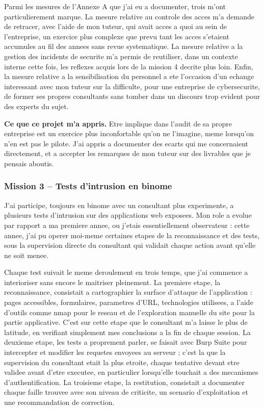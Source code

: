 \documentclass[11pt,a4paper]{article}
\begin{document}
Parmi les mesures de l'Annexe A que j'ai eu a documenter, trois m'ont particulierement marque. La mesure relative au controle des acces m'a demande de retracer, avec l'aide de mon tuteur, qui avait acces a quoi au sein de l'entreprise, un exercice plus complexe que prevu tant les acces s'etaient accumules au fil des annees sans revue systematique. La mesure relative a la gestion des incidents de securite m'a permis de reutiliser, dans un contexte interne cette fois, les reflexes acquis lors de la mission 4 decrite plus loin. Enfin, la mesure relative a la sensibilisation du personnel a ete l'occasion d'un echange interessant avec mon tuteur sur la difficulte, pour une entreprise de cybersecurite, de former ses propres consultants sans tomber dans un discours trop evident pour des experts du sujet.

\textbf{Ce que ce projet m'a appris.} Etre implique dans l'audit de sa propre entreprise est un exercice plus inconfortable qu'on ne l'imagine, meme lorsqu'on n'en est pas le pilote. J'ai appris a documenter des ecarts qui me concernaient directement, et a accepter les remarques de mon tuteur sur des livrables que je pensais aboutis.

\subsubsection*{Mission 3 -- Tests d'intrusion en binome}

J'ai participe, toujours en binome avec un consultant plus experimente, a plusieurs tests d'intrusion sur des applications web exposees. Mon role a evolue par rapport a ma premiere annee, ou j'etais essentiellement observateur : cette annee, j'ai pu operer moi-meme certaines etapes de la reconnaissance et des tests, sous la supervision directe du consultant qui validait chaque action avant qu'elle ne soit menee.

Chaque test suivait le meme deroulement en trois temps, que j'ai commence a interioriser sans encore le maitriser pleinement. La premiere etape, la reconnaissance, consistait a cartographier la surface d'attaque de l'application : pages accessibles, formulaires, parametres d'URL, technologies utilisees, a l'aide d'outils comme nmap pour le reseau et de l'exploration manuelle du site pour la partie applicative. C'est sur cette etape que le consultant m'a laisse le plus de latitude, en verifiant simplement mes conclusions a la fin de chaque session. La deuxieme etape, les tests a proprement parler, se faisait avec Burp Suite pour intercepter et modifier les requetes envoyees au serveur ; c'est la que la supervision du consultant etait la plus etroite, chaque tentative devant etre validee avant d'etre executee, en particulier lorsqu'elle touchait a des mecanismes d'authentification. La troisieme etape, la restitution, consistait a documenter chaque faille trouvee avec son niveau de criticite, un scenario d'exploitation et une recommandation de correction.
\end{document}
